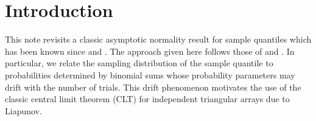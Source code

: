 
\section{Introduction}

This note revisits a classic asymptotic normality result for sample quantiles
which has been known since \citet{1946mostellerSomeUsefulInefficient} and
\citet{1949smirnovLimitDistributionsTerms}.
The approach given here follows those of
\citet[Chapter III Section 4 Example 24,
p. 53]{1984pollardConvergenceStochasticProcesses} and
\citet[Section 2.3.3, pp. 77-84]{1980serflingApproximationTheoremsMathematical}.
In particular, we relate the sampling distribution of the sample
quantile to probabilities determined by binomial sums whose probability
parameters may drift with the number of trials.
This drift phenomenon motivates the use of the classic central limit
theorem (CLT) for independent triangular arrays due to Liapunov.

